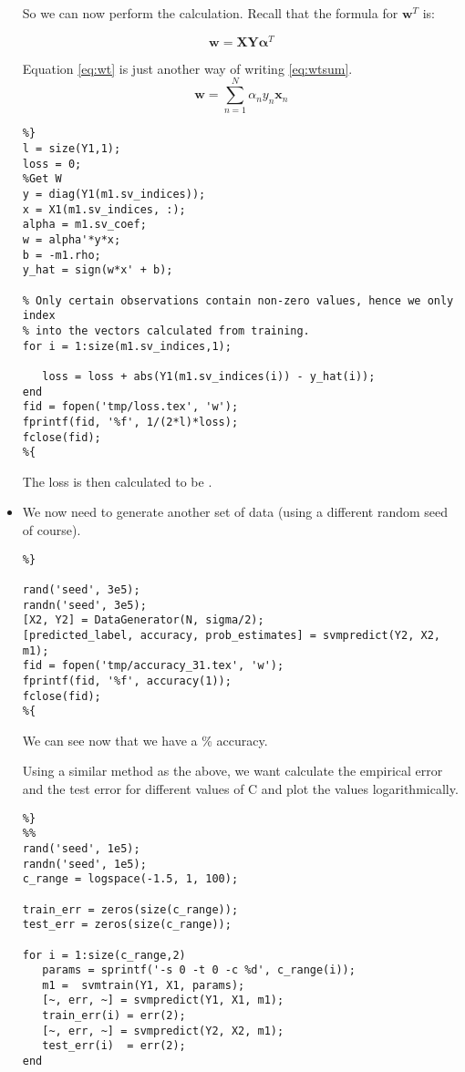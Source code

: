 \documentclass[11pt, twoside]{article}   	%
\begin{document}
\begin{itemize}
So we can now perform the calculation. Recall that the formula for
$\mathbf{w}^T$ is: 

\begin{equation}
\mathbf{w} = \mathbf{X}\mathbf{Y}\mathbf{\alpha}^T
\label{eq:wt}
\end{equation}


Equation \ref{eq:wt} is just another way of writing \ref{eq:wtsum}. 
\begin{equation}
\mathbf{w} = \sum\limits_{n=1}^N \alpha_n y_n \mathbf{x}_n
\label{eq:wtsum}
\end{equation}


\begin{lstlisting}
%}
l = size(Y1,1); 
loss = 0; 
%Get W
y = diag(Y1(m1.sv_indices));
x = X1(m1.sv_indices, :);
alpha = m1.sv_coef;
w = alpha'*y*x;
b = -m1.rho; 
y_hat = sign(w*x' + b);

% Only certain observations contain non-zero values, hence we only index
% into the vectors calculated from training. 
for i = 1:size(m1.sv_indices,1); 
  
   loss = loss + abs(Y1(m1.sv_indices(i)) - y_hat(i));
end
fid = fopen('tmp/loss.tex', 'w');
fprintf(fid, '%f', 1/(2*l)*loss); 
fclose(fid);
%{
\end{lstlisting}
The loss is then calculated to be . 

\item We now need to generate another set of data (using a different random 
 seed of course). 

\begin{lstlisting}
%}

rand('seed', 3e5);
randn('seed', 3e5);
[X2, Y2] = DataGenerator(N, sigma/2);
[predicted_label, accuracy, prob_estimates] = svmpredict(Y2, X2, m1); 
fid = fopen('tmp/accuracy_31.tex', 'w');
fprintf(fid, '%f', accuracy(1)); 
fclose(fid); 
%{
\end{lstlisting}

We can see now that we have a \% accuracy. 

Using a similar method as the above, we want calculate the empirical error
and the test error for different values of C and plot the values
logarithmically. 
\begin{lstlisting}
%}
%%
rand('seed', 1e5);
randn('seed', 1e5);
c_range = logspace(-1.5, 1, 100);

train_err = zeros(size(c_range)); 
test_err = zeros(size(c_range)); 

for i = 1:size(c_range,2)
   params = sprintf('-s 0 -t 0 -c %d', c_range(i)); 
   m1 =  svmtrain(Y1, X1, params);
   [~, err, ~] = svmpredict(Y1, X1, m1); 
   train_err(i) = err(2); 
   [~, err, ~] = svmpredict(Y2, X2, m1);
   test_err(i)  = err(2); 
end


\end{lstlisting}
\end{itemize}
\end{document}

